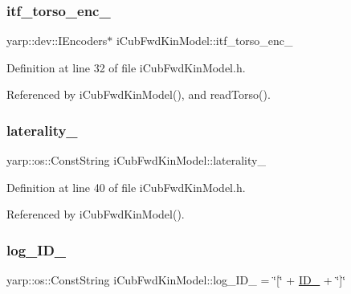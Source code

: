 \subsubsection{\texorpdfstring{itf\+\_\+torso\+\_\+enc\+\_\+}{itf\_torso\_enc\_}}
{\footnotesize\ttfamily yarp\+::dev\+::\+I\+Encoders$\ast$ i\+Cub\+Fwd\+Kin\+Model\+::itf\+\_\+torso\+\_\+enc\+\_\+\hspace{0.3cm}{\ttfamily [protected]}}



Definition at line 32 of file i\+Cub\+Fwd\+Kin\+Model.\+h.



Referenced by i\+Cub\+Fwd\+Kin\+Model(), and read\+Torso().

\mbox{\label{classiCubFwdKinModel_a9894964cecb15d56a55ea1f4610a1cbe}} 
\subsubsection{\texorpdfstring{laterality\+\_\+}{laterality\_}}
{\footnotesize\ttfamily yarp\+::os\+::\+Const\+String i\+Cub\+Fwd\+Kin\+Model\+::laterality\+\_\+\hspace{0.3cm}{\ttfamily [private]}}



Definition at line 40 of file i\+Cub\+Fwd\+Kin\+Model.\+h.



Referenced by i\+Cub\+Fwd\+Kin\+Model().

\mbox{\label{classiCubFwdKinModel_a091abb2a5386537d63a67fbf761a2e8a}} 
\subsubsection{\texorpdfstring{log\+\_\+\+I\+D\+\_\+}{log\_ID\_}}
{\footnotesize\ttfamily yarp\+::os\+::\+Const\+String i\+Cub\+Fwd\+Kin\+Model\+::log\+\_\+\+I\+D\+\_\+ = \char`\"{}\mbox{[}\char`\"{} + \hyperlink{classiCubFwdKinModel_a3eb6c400ef775a5549aa31fe22fae4c0}{I\+D\+\_\+} + \char`\"{}\mbox{]}\char`\"{}\hspace{0.3cm}{\ttfamily [private]}}



